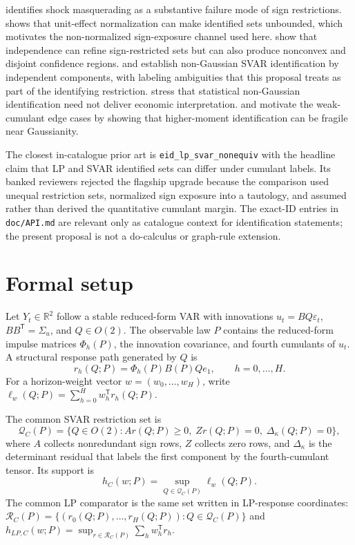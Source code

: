 \documentclass[11pt]{article}
\newcommand{\transpose}{\mathsf{T}}
\newcommand{\R}{\mathbb{R}}
\theoremstyle{definition}
\theoremstyle{plain}
\theoremstyle{remark}
\begin{document}
\citet{wolf_2022_sign_restricted_vars} identifies shock masquerading as a
substantive failure mode of sign restrictions. \citet{read_2022_unit_effect_normalisation}
shows that unit-effect normalization can make identified sets unbounded, which
motivates the non-normalized sign-exposure channel used here.
\citet{drautzburg_wright_2023_independence} show that independence can refine
sign-restricted sets but can also produce nonconvex and disjoint confidence
regions. \citet{gourieroux_monfort_renne_2017_ica_svar} and
\citet{lanne_meitz_saikkonen_2017_nongaussian_svar} establish non-Gaussian SVAR
identification by independent components, with labeling ambiguities that this
proposal treats as part of the identifying restriction. \citet{lanne_luoto_2021_gmm_nongaussian_svar}
stress that statistical non-Gaussian identification need not deliver economic
interpretation. \citet{montielolea_plagborgmoller_qian_2022_higher_moments} and
\citet{hoesch_lee_mesters_2024_nongaussian_svar} motivate the weak-cumulant
edge cases by showing that higher-moment identification can be fragile near
Gaussianity.

The closest in-catalogue prior art is \texttt{eid\_lp\_svar\_nonequiv} with the
headline claim that LP and SVAR identified sets can differ under cumulant labels.
Its banked reviewers rejected the flagship upgrade because the comparison used
unequal restriction sets, normalized sign exposure into a tautology, and assumed
rather than derived the quantitative cumulant margin. The exact-ID entries in
\texttt{doc/API.md} are relevant only as catalogue context for identification
statements; the present proposal is not a do-calculus or graph-rule extension.

\section{Formal setup}
Let \(Y_t\in\R^2\) follow a stable reduced-form VAR with innovations
\(u_t=BQ\varepsilon_t\), \(BB^\transpose=\Sigma_u\), and \(Q\in O(2)\). The
observable law \(P\) contains the reduced-form impulse matrices
\(\Phi_h(P)\), the innovation covariance, and fourth cumulants of \(u_t\). A
structural response path generated by \(Q\) is
\[
r_h(Q;P)=\Phi_h(P)B(P)Qe_1,\qquad h=0,\ldots,H.
\]
For a horizon-weight vector \(w=(w_0,\ldots,w_H)\), write
\(\ell_w(Q;P)=\sum_{h=0}^H w_h^\transpose r_h(Q;P)\).

The common SVAR restriction set is
\[
\mathcal Q_C(P)=\{Q\in O(2): A r(Q;P)\ge 0,\; Zr(Q;P)=0,\;
\Delta_\kappa(Q;P)=0\},
\]
where \(A\) collects nonredundant sign rows, \(Z\) collects zero rows, and
\(\Delta_\kappa\) is the determinant residual that labels the first component
by the fourth-cumulant tensor. Its support is
\[
h_C(w;P)=\sup_{Q\in\mathcal Q_C(P)}\ell_w(Q;P).
\]
The common LP comparator is the same set written in LP-response coordinates:
\(\mathcal R_C(P)=\{(r_0(Q;P),\ldots,r_H(Q;P)):Q\in\mathcal Q_C(P)\}\) and
\(h_{LP,C}(w;P)=\sup_{r\in\mathcal R_C(P)}\sum_h w_h^\transpose r_h\).
\end{document}
